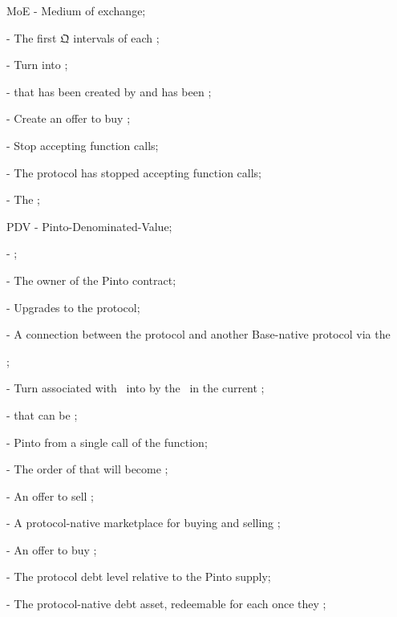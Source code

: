 \documentclass[class=article, crop=false]{standalone}
\begin{document}
\begin{itemize}[topsep=0pt, itemsep=3pt,leftmargin=16pt]
{    \item[] MoE - Medium of exchange;
    \item[]  - The first $\mathfrak{Q}$ intervals of each ;
    \item[]  - Turn  into ;
    \item[]  -  that has been created by  and has been ;
    \item[]  - Create an offer to buy ;
    \item[]  - Stop accepting  function calls;
    \item[]  - The protocol has stopped accepting  function calls;
    \item[]  - The ;
    \item[] PDV - Pinto-Denominated-Value;
    \item[]  - ;
    \item[]  - The owner of the Pinto contract;
    \item[]  - Upgrades to the protocol;    
    \item[]  - A connection between the protocol and another Base-native protocol via the };
    \item[]  - Turn  associated with  \Pinto\ into  by  the  \Pinto\ in the current ;
    \item[]  -  that can be ;
    \item[]  - Pinto  from a single call of the  function;
    \item[]  - The order of  that will become ;
    \item[]  - An offer to sell ;
    \item[]  - A protocol-native marketplace for buying and selling ;
    \item[]  - An offer to buy ;
    \item[]  - The protocol debt level relative to the Pinto supply;
    \item[]  - The protocol-native debt asset, redeemable for  each once they ;

\end{itemize}
\end{document}
